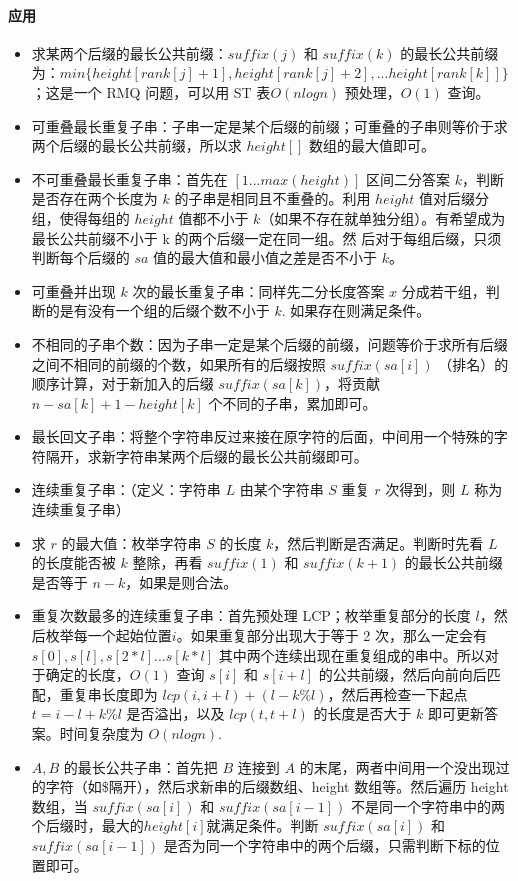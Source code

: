 \paragraph{应用}
\begin{itemize}
    \item 求某两个后缀的最长公共前缀：$suffix(j)$ 和 $suffix(k)$ 的最长公共前缀为：$min\{height[rank[j] + 1], height[rank[j] + 2], ... height[rank[k]]\}$；这是一个 RMQ 问题，可以用 ST 表$O(nlogn)$ 预处理，$O(1)$ 查询。
    \item 可重叠最长重复子串：子串一定是某个后缀的前缀；可重叠的子串则等价于求两个后缀的最长公共前缀，所以求 $height[]$ 数组的最大值即可。
    \item 不可重叠最长重复子串：首先在 $[1...max(height)]$ 区间二分答案 $k$，判断是否存在两个长度为 $k$ 的子串是相同且不重叠的。利用 $height$ 值对后缀分组，使得每组的 $height$ 值都不小于 $k$（如果不存在就单独分组）。有希望成为最长公共前缀不小于 k 的两个后缀一定在同一组。然
    后对于每组后缀，只须判断每个后缀的 $sa$ 值的最大值和最小值之差是否不小于 $k$。
    \item 可重叠并出现 $k$ 次的最长重复子串：同样先二分长度答案 $x$ 分成若干组，判断的是有没有一个组的后缀个数不小于 $k$. 如果存在则满足条件。
    \item 不相同的子串个数：因为子串一定是某个后缀的前缀，问题等价于求所有后缀之间不相同的前缀的个数，如果所有的后缀按照 $suffix(sa[i])$ （排名）的顺序计算，对于新加入的后缀 $suffix(sa[k])$，将贡献 $n - sa[k] + 1 - height[k]$ 个不同的子串，累加即可。
    \item 最长回文子串：将整个字符串反过来接在原字符的后面，中间用一个特殊的字符隔开，求新字符串某两个后缀的最长公共前缀即可。
    \item 连续重复子串：（定义：字符串 $L$ 由某个字符串 $S$ 重复 $r$ 次得到，则 $L$ 称为连续重复子串）
    \item 求 $r$ 的最大值：枚举字符串 $S$ 的长度 $k$，然后判断是否满足。判断时先看 $L$ 的长度能否被 $k$ 整除，再看 $suffix(1)$ 和 $suffix(k+1)$ 的最长公共前缀是否等于 $n-k$，如果是则合法。
    \item 重复次数最多的连续重复子串：首先预处理 LCP；枚举重复部分的长度 $l$，然后枚举每一个起始位置$i$。如果重复部分出现大于等于 2 次，那么一定会有 $s[0], s[l], s[2*l]...s[k*l]$ 其中两个连续出现在重复组成的串中。所以对于确定的长度，$O(1)$ 查询 $s[i]$ 和 $s[i+l]$ 的公共前缀，然后向前向后匹配，重复串长度即为 $lcp(i, i + l) + (l - k \% l)$，然后再检查一下起点 $t=i-l+k\%l$ 是否溢出，以及 $lcp(t, t+l)$ 的长度是否大于 $k$ 即可更新答案。时间复杂度为 $O(nlogn)$.
    \item $A,B$ 的最长公共子串：首先把 $B$ 连接到 $A$ 的末尾，两者中间用一个没出现过的字符（如\$隔开），然后求新串的后缀数组、height 数组等。然后遍历 height 数组，当 $suffix(sa[i])$ 和 $suffix(sa[i-1])$ 不是同一个字符串中的两个后缀时，最大的$height[i]$就满足条件。判断 $suffix(sa[i])$ 和 $suffix(sa[i-1])$ 是否为同一个字符串中的两个后缀，只需判断下标的位置即可。

\end{itemize}
